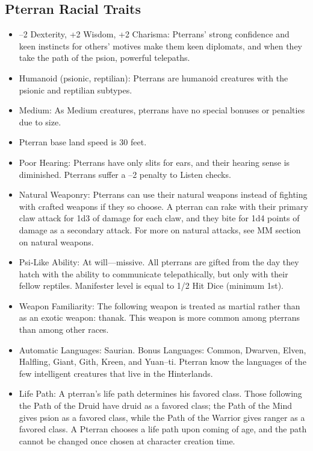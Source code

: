 \documentclass[10pt,a4paper,twocolumn]{d20}
\begin{document}
{\subsection{Pterran Racial Traits}
\begin{itemize}
    \item –2 Dexterity, +2 Wisdom, +2 Charisma: Pterrans’ strong confidence and keen instincts for others’ motives make them keen diplomats, and when they take the path of the psion, powerful telepaths.
    \item Humanoid (psionic, reptilian): Pterrans are humanoid creatures with the psionic and reptilian subtypes.
    \item Medium: As Medium creatures, pterrans have no special bonuses or penalties due to size.
    \item Pterran base land speed is 30 feet.
    \item Poor Hearing: Pterrans have only slits for ears, and their hearing sense is diminished. Pterrans suffer a –2 penalty to Listen checks.
    \item Natural Weaponry: Pterrans can use their natural weapons instead of fighting with crafted weapons if they so choose. A pterran can rake with their primary claw attack for 1d3 of damage for each claw, and they bite for 1d4 points of damage as a secondary attack. For more on natural attacks, see MM section on natural weapons.
    \item Psi‐Like Ability: At will---missive. All pterrans are gifted from the day they hatch with the ability to communicate telepathically, but only with their fellow reptiles. Manifester level is equal to 1/2 Hit Dice (minimum 1st).
    \item Weapon Familiarity: The following weapon is treated as martial rather than as an exotic weapon: thanak. This weapon is more common among pterrans than among other races.
    \item Automatic Languages: Saurian. Bonus Languages: Common, Dwarven, Elven, Halfling, Giant, Gith, Kreen, and Yuan–ti. Pterran know the languages of the few intelligent creatures that live in the Hinterlands.
    \item Life Path: A pterran’s life path determines his favored class. Those following the Path of the Druid have druid as a favored class; the Path of the Mind gives psion as a favored class, while the Path of the Warrior gives ranger as a favored class. A Pterran chooses a life path upon coming of age, and the path cannot be changed once chosen at character creation time.
\end{itemize}

}
\end{document}
